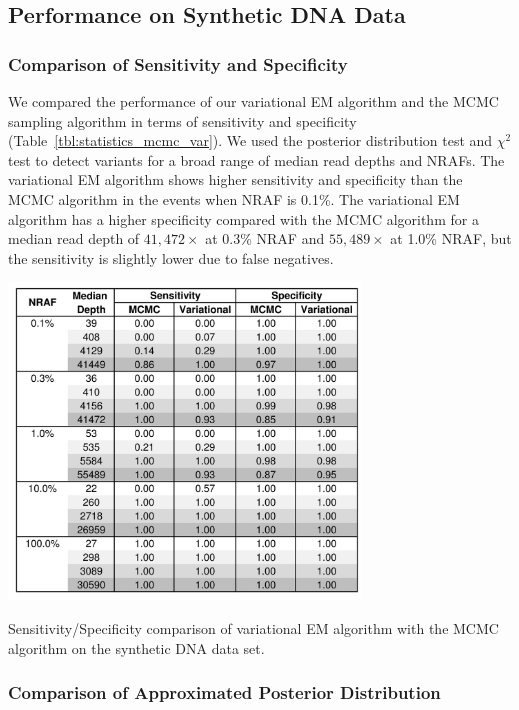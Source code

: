 \documentclass[11pt,reqno]{amsart}
\begin{document}
\subsection{Performance on Synthetic DNA Data}

\subsubsection{Comparison of Sensitivity and Specificity}

We compared the performance of our variational EM algorithm and the MCMC sampling algorithm in terms of sensitivity and specificity (Table~\ref{tbl:statistics_mcmc_var}).
We used the posterior distribution test and $\chi^2$ test to detect variants for a broad range of median read depths and NRAFs.
The variational EM algorithm shows higher sensitivity and specificity than the MCMC algorithm in the events when NRAF is 0.1\%.
The variational EM algorithm has a higher specificity compared with the MCMC algorithm for a median read depth of $41,472\times$ at 0.3\% NRAF and $55,489\times$ at 1.0\% NRAF, but the sensitivity is slightly lower due to false negatives.
%
\begin{table}[ht]
\centering
\includegraphics[width=0.7\textwidth]{tables/statistics_mcmc_var.png}
\vspace{5pt}
\caption{Sensitivity/Specificity comparison of variational EM algorithm with the MCMC algorithm on the synthetic DNA data set.}
\label{tbl:statistics_mcmc_var}
\end{table}

\subsubsection{Comparison of Approximated Posterior Distribution}
\end{document}
